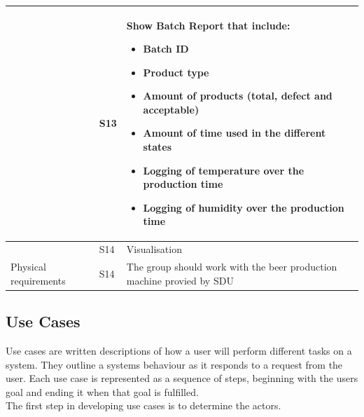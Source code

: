 \begin{table}[H]
\begin{tabularx}{\textwidth}{|>{\RaggedRight}p{5.25cm}|>{\RaggedRight}p{0.6cm}|>{\RaggedRight}X|}
                & S13 & Show Batch Report that include:
            \begin{itemize}
                \item Batch ID
                \item Product type
                \item Amount of products (total, defect and acceptable)
                \item Amount of time used in the different states
                \item Logging of temperature over the production time
                \item Logging of humidity over the production time
            \end{itemize} \\
        \cline{2-3}
            & S14 & Visualisation \\
        \hline
        Physical requirements & S14 & The group should work with the beer 
        production machine provied by SDU \\
        \hline
    \end{tabularx}
    \label{table:sup_requirements}
\end{table} 

\subsection{Use Cases}
Use cases are written descriptions of how a user will perform different tasks
on a system. They outline a systems behaviour as it responds to a request from
the user. Each use case is represented as a sequence of steps, beginning with
the users goal and ending it when that goal is fulfilled. \\

The first step in developing use cases is to determine the actors.


